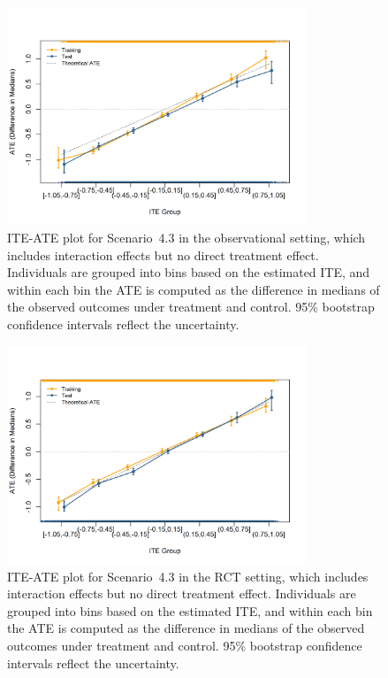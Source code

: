 \begin{figure}[htbp]
\centering
\includegraphics[width=0.8\textwidth]{img/results/observ_scenario3_ITE_ATE.png}
\vspace{-15pt}
\caption{ITE-ATE plot for Scenario~4.3 in the observational setting, which includes interaction effects but no direct treatment effect. Individuals are grouped into bins based on the estimated ITE, and within each bin the ATE is computed as the difference in medians of the observed outcomes under treatment and control. 95\% bootstrap confidence intervals reflect the uncertainty.}
\label{fig:observ_scenario3_ite_ATE}
\end{figure}


\begin{figure}[htbp]
\centering
\includegraphics[width=0.8\textwidth]{img/results/rct_scenario3_ITE_ATE.png}
\vspace{-15pt}
\caption{ITE-ATE plot for Scenario~4.3 in the RCT setting, which includes interaction effects but no direct treatment effect. Individuals are grouped into bins based on the estimated ITE, and within each bin the ATE is computed as the difference in medians of the observed outcomes under treatment and control. 95\% bootstrap confidence intervals reflect the uncertainty.}
\label{fig:rct_scenario3_ite_ATE}
\end{figure}




